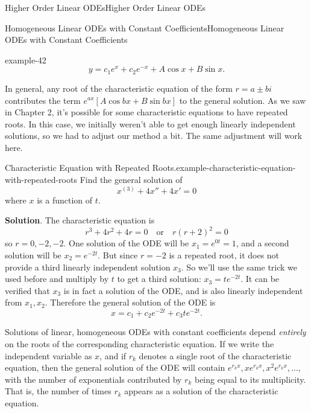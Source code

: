 \documentclass[10pt,]{book}
\numberwithin{equation}{section}
\newcommand{\brackets}[1]{\left[ #1 \right]}
\begin{document}
\begin{chapterptx}{Higher Order Linear ODEs}{}{Higher Order Linear ODEs}{}{}
\begin{sectionptx}{Homogeneous Linear ODEs with Constant Coefficients}{}{Homogeneous Linear ODEs with Constant Coefficients}{}{}
\begin{example}{}{example-42}
\begin{equation*}
y = c_{1}e^{x}+c_{2}e^{-x}+A\cos x+B\sin x.
\end{equation*}
%
\end{example}
\hypertarget{p-273}{}%
In general, any root of the characteristic equation of the form \(r=a\pm bi\) contributes the term \(e^{ax}\brackets{A\cos bx+B\sin bx}\) to the general solution. As we saw in Chapter 2, it's possible for some characteristic equations to have repeated roots. In this case, we initially weren't able to get enough linearly independent solutions, so we had to adjust our method a bit. The same adjustment will work here.%
\begin{example}{Characteristic Equation with Repeated Roots.}{example-characteristic-equation-with-repeated-roots}%
\hypertarget{p-274}{}%
Find the general solution of%
\begin{equation*}
x^{(3)}+4x''+4x'=0
\end{equation*}
where \(x\) is a function of \(t\).%
\par\smallskip%
\noindent\textbf{Solution}.\hypertarget{solution-40}{}\quad%
\hypertarget{p-275}{}%
The characteristic equation is%
\begin{equation*}
r^{3}+4r^{2}+4r = 0\quad\text{or}\quad r(r+2)^{2}=0
\end{equation*}
so \(r=0,-2,-2\). One solution of the ODE will be \(x_{1} = e^{0t} = 1\), and a second solution will be \(x_{2} = e^{-2t}\). But since \(r=-2\) is a repeated root, it does not provide a third linearly independent solution \(x_{3}\). So we'll use the same trick we used before and multiply by \(t\) to get a third solution: \(x_{3} = te^{-2t}\). It can be verified that \(x_{3}\) is in fact a solution of the ODE, and is also linearly independent from \(x_{1},x_{2}\). Therefore the general solution of the ODE is%
\begin{equation*}
x = c_{1}+c_{2}e^{-2t}+c_{3}te^{-2t}.
\end{equation*}
%
\end{example}
\hypertarget{p-276}{}%
Solutions of linear, homogeneous ODEs with constant coefficients depend \emph{entirely} on the roots of the corresponding characteristic equation. If we write the independent variable as \(x\), and if \(r_{k}\) denotes a single root of the characteristic equation, then the general solution of the ODE will contain \(e^{r_{k}x},xe^{r_{k}x},x^{2}e^{r_{k}x},\dots\), with the number of exponentials contributed by \(r_{k}\) being equal to its multiplicity. That is, the number of times \(r_{k}\) appears as a solution of the characteristic equation.%

\end{sectionptx}
\end{chapterptx}
\end{document}
